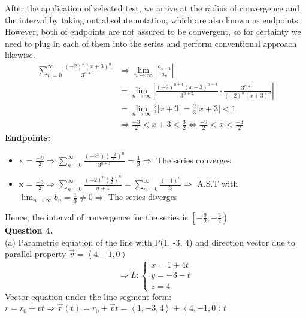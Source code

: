 \documentclass[a4paper]{exam}
\begin{document}
	\noindent After the application of selected test, we arrive at the radius of convergence and the interval by taking out absolute notation, which are also known as endpoints. However, both of endpoints are not assured to be convergent, so for certainty we need to plug in each of them into the series and perform conventional approach likewise.	
	\begin{align*}
		\sum_{n = 0}^{\infty} \frac{(-2)^{n}(x + 3)^{n}}{3^{n + 1}}
		&\Longrightarrow 
		\lim_{n \to \infty} \left| \frac{a_{n + 1}}{a_{n}} \right| \\
		&= \lim_{n \to \infty} \left| \frac{(-2)^{n + 1}(x + 3)^{n + 1}}{3^{n + 2}} \cdot \frac{3^{n + 1}}{(-2)^{n}(x + 3)^{n}} \right| \\
		&= \lim_{n \to \infty} \frac{2}{3} \left| x + 3 \right| = \frac{2}{3} \left| x + 3 \right| < 1 \\
		&\Longrightarrow \frac{-3}{2} < x + 3 < \frac{3}{2} \Longleftrightarrow \frac{-9}{2} < x < \frac{-3}{2}
	\end{align*}
	\textbf{Endpoints: }
	
	\begin{itemize}
		\item x = $\frac{-9}{2} \Longrightarrow \sum_{n = 0}^{\infty} \frac{(-2^{n})(\frac{-3}{2})^{n}}{3^{n + 1}} = \frac{1}{3} \Longrightarrow$ The series converges
		\item x = $\frac{-3}{2} \Longrightarrow \sum_{n = 0}^{\infty} \frac{(-2)^{n}(\frac{3}{2})^{n}}{n + 1} = \sum_{n = 0}^{\infty} \frac{(-1)^{n}}{3} \Longrightarrow$ A.S.T with $\lim_{n \to \infty} b_{n} = \frac{1}{3} \neq 0 \Longrightarrow$ The series diverges
	\end{itemize}
	
	\vspace*{1mm}
	
	\noindent Hence, the interval of convergence for the series is $\left[-\frac{9}{2}, -\frac{3}{2}\right)$ \\[0.5ex]
	
	\noindent \textbf{Question 4.} \\[0.5em]
	\noindent (a) Parametric equation of the line with P(1, -3, 4) and direction vector due to parallel property $\vec{v} = \left\langle 4, -1, 0 \right\rangle$
	$$ \Longrightarrow L: \begin{cases}
		x = 1 + 4t \\
		y = -3 - t \\
		z = 4
	\end{cases} $$
	\noindent Vector equation under the line segment form: $r = r_{0} + vt \Longrightarrow \vec{r}(t) = r_{0} + \vec{v}t = \left\langle 1, -3, 4 \right\rangle + \left\langle 4, -1, 0 \right\rangle t$ \\[0.5em]
	
\end{document}
